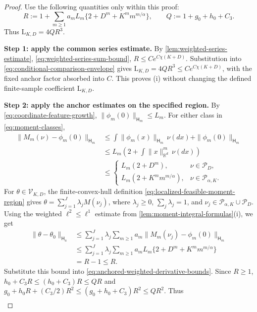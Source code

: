 \begin{proof}
Use the following quantities only within this proof:
\[
 R:=1+\sum_{m\ge1}a_mL_m\{2+D^m+K^m m^{m/\alpha}\},
 \qquad Q:=1+g_0+h_0+C_3.
\]
Thus $\mathrm L_{K,D}=4QR^3$.

\noindent\textbf{Step 1: apply the common series estimate.}
By \cref{lem:weighted-series-estimate}, \eqref{eq:weighted-series-sum-bound},
$R\le Ce^{C\chi(K+D)}$. Substitution into
\eqref{eq:conditional-comparison-envelope} gives
$\mathrm L_{K,D}=4QR^3\le Ce^{C\chi(K+D)}$, with the fixed anchor
factor absorbed into $C$. This proves (i) without changing the defined
finite-sample coefficient $\mathrm L_{K,D}$.

\noindent\textbf{Step 2: apply the anchor estimates on the specified region.}
By \eqref{eq:coordinate-feature-growth}, $\|\phi_m(0)\|_{\mathsf H_m}\le L_m$.
For either class in \eqref{eq:moment-classes},
\[
\begin{aligned}
 \|M_m(\nu)-\phi_m(0)\|_{\mathsf H_m}
 &\le\int\|\phi_m(x)\|_{\mathsf H_m}\,\nu(dx)+\|\phi_m(0)\|_{\mathsf H_m}\\
 &\le L_m\left(2+\int\|x\|_{\mathbb R^d}^m\,\nu(dx)\right)\\
 &\le
 \begin{cases}
 L_m(2+D^m),&\nu\in\mathcal P_D,\\
 L_m(2+K^m m^{m/\alpha}),&\nu\in\mathcal P_{\alpha,K}.
 \end{cases}
\end{aligned}
\]
For $\theta\in\mathcal V_{K,D}$, the finite-convex-hull definition
\eqref{eq:localized-feasible-moment-region} gives
$\theta=\sum_{j=1}^J\lambda_jM(\nu_j)$, where
$\lambda_j\ge0$, $\sum_j\lambda_j=1$, and
$\nu_j\in\mathcal P_{\alpha,K}\cup\mathcal P_D$.
Using the weighted $\ell^2\le\ell^1$ estimate from
\cref{lem:moment-integral-formulas}(i), we get
\[
\begin{aligned}
 \|\theta-\theta_0\|_{\mathsf H_a}
 &\le\sum_{j=1}^J\lambda_j
           \sum_{m\ge1}a_m\|M_m(\nu_j)-\phi_m(0)\|_{\mathsf H_m}\\
 &\le\sum_{j=1}^J\lambda_j
           \sum_{m\ge1}a_mL_m\{2+D^m+K^m m^{m/\alpha}\}\\
 &=R-1\le R.
\end{aligned}
\]
Substitute this bound into
\eqref{eq:anchored-weighted-derivative-bounds}. Since $R\ge1$,
$h_0+C_3R\le(h_0+C_3)R\le QR$ and
$g_0+h_0R+(C_3/2)R^2\le(g_0+h_0+C_3)R^2\le QR^2$.
Thus
\begin{equation}
\label{eq:local-anchor-intermediate}
\begin{aligned}

\end{aligned}
\end{equation}
\end{proof}
